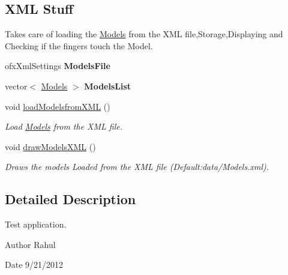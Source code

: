 \subsection*{X\-M\-L Stuff}
\label{_amgrp30ed6d911a1420be854691672138b449}%
Takes care of loading the \hyperlink{class_models}{Models} from the X\-M\-L file,Storage,Displaying and Checking if the fingers touch the Model. \begin{DoxyCompactItemize}
\item 
\hypertarget{classtest_app_aa20473a935d49170d16dd7da21124056}{ofx\-Xml\-Settings {\bfseries Models\-File}}\label{classtest_app_aa20473a935d49170d16dd7da21124056}

\item 
\hypertarget{classtest_app_a1bfb9be4aa89d5b89983defa2d235113}{vector$<$ \hyperlink{class_models}{Models} $>$ {\bfseries Models\-List}}\label{classtest_app_a1bfb9be4aa89d5b89983defa2d235113}

\item 
\hypertarget{classtest_app_a307def5df81c899db2107fa85ef6a081}{void \hyperlink{classtest_app_a307def5df81c899db2107fa85ef6a081}{load\-Modelsfrom\-X\-M\-L} ()}\label{classtest_app_a307def5df81c899db2107fa85ef6a081}

\begin{DoxyCompactList}\small\item\em Load \hyperlink{class_models}{Models} from the X\-M\-L file. \end{DoxyCompactList}\item 
\hypertarget{classtest_app_aca7cf2d8efb6d7ccecadf86bb97afc2b}{void \hyperlink{classtest_app_aca7cf2d8efb6d7ccecadf86bb97afc2b}{draw\-Models\-X\-M\-L} ()}\label{classtest_app_aca7cf2d8efb6d7ccecadf86bb97afc2b}

\begin{DoxyCompactList}\small\item\em Draws the models Loaded from the X\-M\-L file (Default\-:data/\-Models.\-xml). \end{DoxyCompactList}\end{DoxyCompactItemize}


\subsection{Detailed Description}
Test application. 

\begin{DoxyAuthor}{Author}
Rahul 
\end{DoxyAuthor}
\begin{DoxyDate}{Date}
9/21/2012 
\end{DoxyDate}


